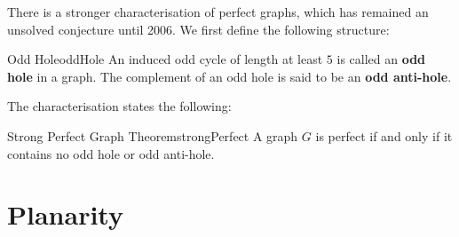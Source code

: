 \documentclass[math]{amznotes}
\makeatletter
\let\save@mathaccent\mathaccent
\newcommand*\if@single[3]{%
  \setbox0\hbox{${\mathaccent"0362{#1}}^H$}%
  \setbox2\hbox{${\mathaccent"0362{\kern0pt#1}}^H$}%
  \ifdim\ht0=\ht2 #3\else #2\fi
  }
\newcommand*\rel@kern[1]{\kern#1\dimexpr\macc@kerna}
\newcommand*\widebar[1]{\@ifnextchar^{{\wide@bar{#1}{0}}}{\wide@bar{#1}{1}}}
\newcommand*\wide@bar[2]{\if@single{#1}{\wide@bar@{#1}{#2}{1}}{\wide@bar@{#1}{#2}{2}}}
\newcommand*\wide@bar@[3]{%
  \begingroup
  \def\mathaccent##1##2{%
    \let\mathaccent\save@mathaccent
    \if#32 \let\macc@nucleus\first@char \fi
    \setbox\z@\hbox{$\macc@style{\macc@nucleus}_{}$}%
    \setbox\tw@\hbox{$\macc@style{\macc@nucleus}{}_{}$}%
    \dimen@\wd\tw@
    \advance\dimen@-\wd\z@
    \divide\dimen@ 3
    \@tempdima\wd\tw@
    \advance\@tempdima-\scriptspace
    \divide\@tempdima 10
    \advance\dimen@-\@tempdima
    \ifdim\dimen@>\z@ \dimen@0pt\fi
    \rel@kern{0.6}\kern-\dimen@
    \if#31
      \overline{\rel@kern{-0.6}\kern\dimen@\macc@nucleus\rel@kern{0.4}\kern\dimen@}%
      \advance\dimen@0.4\dimexpr\macc@kerna
      \let\final@kern#2%
      \ifdim\dimen@<\z@ \let\final@kern1\fi
      \if\final@kern1 \kern-\dimen@\fi
    \else
      \overline{\rel@kern{-0.6}\kern\dimen@#1}%
    \fi
  }%
  \macc@depth\@ne
  \let\math@bgroup\@empty \let\math@egroup\macc@set@skewchar
  \mathsurround\z@ \frozen@everymath{\mathgroup\macc@group\relax}%
  \macc@set@skewchar\relax
  \let\mathaccentV\macc@nested@a
  \if#31
    \macc@nested@a\relax111{#1}%
  \else
    \def\gobble@till@marker##1\endmarker{}%
    \futurelet\first@char\gobble@till@marker#1\endmarker
    \ifcat\noexpand\first@char A\else
      \def\first@char{}%
    \fi
    \macc@nested@a\relax111{\first@char}%
  \fi
  \endgroup
}
\theoremstyle{remark}
\newcommand{\0}{\mathbf{0}}
\newcommand{\1}{\mathbf{1}}
\makeatother
\begin{document}
There is a stronger characterisation of perfect graphs, which has remained an unsolved conjecture until 2006. We first define the following structure:
\begin{dfnbox}{Odd Hole}{oddHole}
    An induced odd cycle of length at least $5$ is called an {\color{red} \textbf{odd hole}} in a graph. The complement of an odd hole is said to be an {\color{red} \textbf{odd anti-hole}}.
\end{dfnbox}
The characterisation states the following:
\begin{thmbox}{Strong Perfect Graph Theorem}{strongPerfect}
    A graph $G$ is perfect if and only if it contains no odd hole or odd anti-hole.
\end{thmbox}
\chapter{Planarity}
\end{document}

